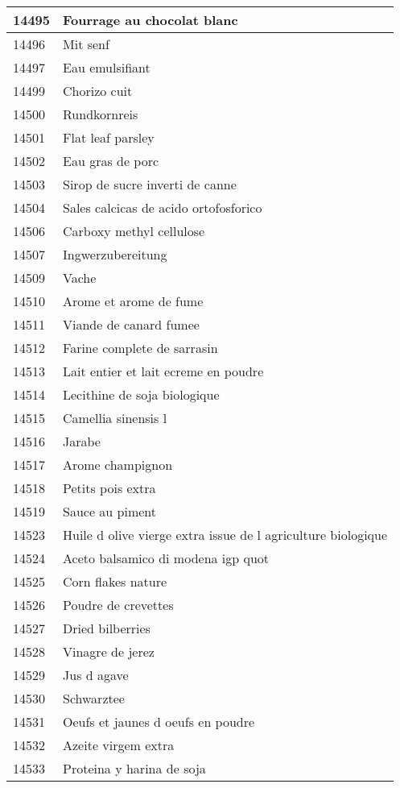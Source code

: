 \begin{longtable}{|l|l|}
14495 & Fourrage au chocolat blanc \\ \hline 
14496 & Mit senf \\ \hline 
14497 & Eau emulsifiant \\ \hline 
14499 & Chorizo cuit \\ \hline 
14500 & Rundkornreis \\ \hline 
14501 & Flat leaf parsley \\ \hline 
14502 & Eau gras de porc \\ \hline 
14503 & Sirop de sucre inverti de canne \\ \hline 
14504 & Sales calcicas de acido ortofosforico \\ \hline 
14506 & Carboxy methyl cellulose \\ \hline 
14507 & Ingwerzubereitung \\ \hline 
14509 & Vache \\ \hline 
14510 & Arome et arome de fume \\ \hline 
14511 & Viande de canard fumee \\ \hline 
14512 & Farine complete de sarrasin \\ \hline 
14513 & Lait entier et lait ecreme en poudre \\ \hline 
14514 & Lecithine de soja biologique \\ \hline 
14515 & Camellia sinensis l \\ \hline 
14516 & Jarabe \\ \hline 
14517 & Arome champignon \\ \hline 
14518 & Petits pois extra \\ \hline 
14519 & Sauce au piment \\ \hline 
14523 & Huile d olive vierge extra issue de l agriculture biologique \\ \hline 
14524 & Aceto balsamico di modena igp quot \\ \hline 
14525 & Corn flakes nature \\ \hline 
14526 & Poudre de crevettes \\ \hline 
14527 & Dried bilberries \\ \hline 
14528 & Vinagre de jerez \\ \hline 
14529 & Jus d agave \\ \hline 
14530 & Schwarztee \\ \hline 
14531 & Oeufs et jaunes d oeufs en poudre \\ \hline 
14532 & Azeite virgem extra \\ \hline 
14533 & Proteina y harina de soja \\ \hline 

\end{longtable}
